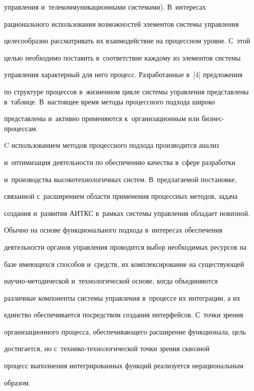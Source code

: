 управления и~телекоммуникационными системами). В~интересах 

рационального использования возможностей элементов системы управления 

целесообразно рассматривать их взаимодействие на процессном уровне. С~этой 

целью необходимо поставить в~соответствие каждому из элементов системы 

управления характерный для него процесс. Разработанные в~[4] предложения 

по структуре процессов в~жизненном цикле системы управления представлены в~таблице. В~настоящее время методы процессного подхода широко 

представлены и~активно применяются к~организационным или бизнес-процессам.





  

  C использованием методов процессного подхода производится анализ 

и~оптимизация деятельности по обеспечению качества в~сфере разработки 

и~производства высокотехнологичных систем. В~предлагаемой постановке, 

связанной с~расширением области применения процессных методов, задача 

создания и~развития АИТКС в~рамках системы управления обладает новизной. 

Обычно на основе функционального подхода в~интересах обеспечения 

деятельности органов управления проводится выбор необходимых ресурсов на 

базе имеющихся способов и~средств, их комплексирование на существующей  

на\-уч\-но-ме\-то\-ди\-че\-ской и~технологической основе, когда объединяются 

различные компоненты системы управления в~процессе их интеграции, а их 

единство обеспечивается посредством создания интерфейсов. С~точки зрения 

организационного процесса, обеспечивающего расширение функционала, цель 

достигается, но с~тех\-ни\-ко-тех\-но\-ло\-ги\-че\-ской точки зрения сквозной 

процесс выполнения интегрированных функций реализуется нерациональным 

образом.

